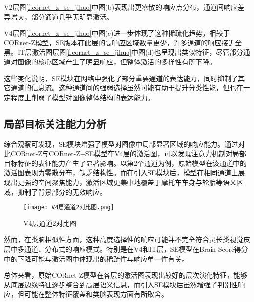 V2层图\ref{f.cornet_z_se_jihuo}中图(b)表现出更零散的响应点分布，通道间响应差异增大，部分通道几乎无明显激活。

V4层图\ref{f.cornet_z_se_jihuo}中图(c)进一步体现了这种稀疏化趋势，相较于CORnet-Z模型，SE版本在此层的高响应区域数量更少，许多通道的响应接近全黑。IT层激活图层图\ref{f.cornet_z_se_jihuo}中图(d)也呈现出类似特征，尽管部分通道对图像的核心区域产生了明显响应，但整体激活的多样性有所下降。

这些变化说明，SE模块在网络中强化了部分重要通道的表达能力，同时抑制了其它通道的信息流。这种通道间的强弱选择虽然可能有助于提升分类性能，但也在一定程度上削弱了模型对图像整体结构的表达能力。

\subsection{局部目标关注能力分析}

综合观察可发现，SE模块增强了模型对图像中局部显著区域的响应能力。通过对比CORnet-Z与CORnet-Z+SE模型在V4层的激活图，可以发现注意力机制对局部目标特征的表征能力产生了显著影响。以第2个通道为例，原始模型在该通道中的激活图表现为零散分布，缺乏结构性。而在引入SE模块后，模型在相同通道上展现出更强的空间聚焦能力，激活区域更集中地覆盖于摩托车车身与轮胎等语义区域，抑制了背景部分的无效响应。

\begin{figure}[hbt]
	\centering
	\texttt{[image: V4层通道2对比图.png]}
	\caption{V4层通道2对比图}
	\label{f.v4_2_act}
\end{figure}

然而，在类脑相似性方面，这种高度选择性的响应可能并不完全符合灵长类视觉皮层中多通道、分布式的响应模式。特别是在V4和IT层，SE模型在Brain-Score得分中的下降可能与激活图中体现出的稀疏性与响应单一性有关。

总体来看，原始CORnet-Z模型在各层的激活图表现出较好的层次演化特征，能够从底层边缘特征逐步整合到高层语义信息，而引入SE模块后虽然增强了判别性响应，但可能在整体特征覆盖和类脑表现方面有所取舍。

